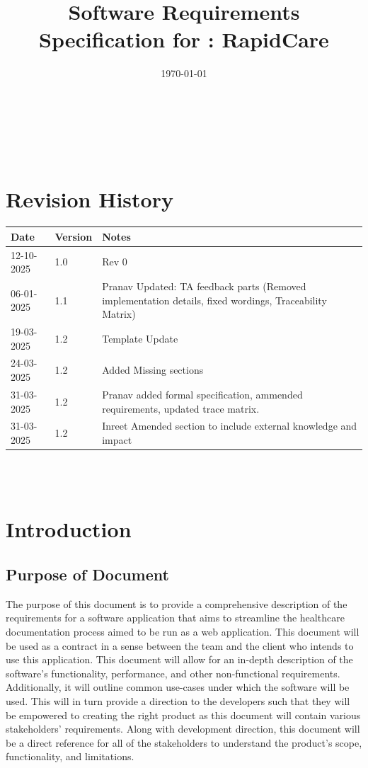 \documentclass[12pt]{article}
\begin{document}
\title{Software Requirements Specification for \progname: RapidCare} 
\author{\authname}
\date{\today}
	
\maketitle

~\newpage


\tableofcontents
~\newpage

\section*{Revision History}

\begin{tabularx}{\textwidth}{p{3cm}p{2cm}X}
\toprule {\textbf{Date}} & {\textbf{Version}} & {\textbf{Notes}}\\
\midrule
12-10-2025 & 1.0 & Rev 0\\
06-01-2025 & 1.1 & Pranav Updated: TA feedback parts (Removed implementation details, fixed wordings, Traceability Matrix)\\
19-03-2025 & 1.2 & Template Update \\
24-03-2025 &1.2 & Added Missing sections \\
31-03-2025 & 1.2 & Pranav added formal specification, ammended requirements, updated trace matrix. \\
31-03-2025 & 1.2 & Inreet Amended section to include external knowledge and impact \\


\bottomrule
\end{tabularx}

~\\

~\newpage

\section{Introduction}

\subsection{Purpose of Document} \label{sec_PurposeOfDocument}
The purpose of this document is to provide a comprehensive description of the requirements for a software application that aims to streamline the healthcare documentation process aimed to be run as a web application. This document will be used as a contract in a sense between the team and the client who intends to use this application. This document will allow for an in-depth description of the software's functionality, performance, and other non-functional requirements. Additionally, it will outline common use-cases under which the software will be used. This will in turn provide a direction to the developers such that they will be empowered to creating the right product as this document will contain various stakeholders' requirements. Along with development direction, this document will be a direct reference for all of the stakeholders to understand the product's scope, functionality, and limitations.
\end{document}
